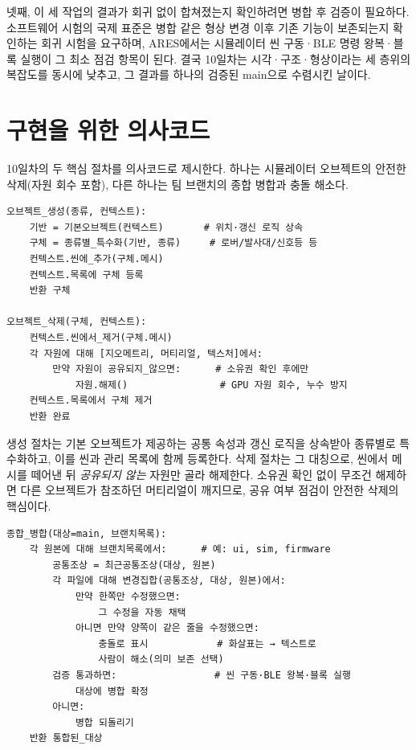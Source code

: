 넷째, 이 세 작업의 결과가 회귀 없이 합쳐졌는지 확인하려면 병합 후 검증이 필요하다. 소프트웨어 시험의 국제 표준은 병합 같은 형상 변경 이후 기존 기능이 보존되는지 확인하는 회귀 시험을 요구하며\cite{iso29119,ieee829}, ARES에서는 시뮬레이터 씬 구동·BLE 명령 왕복·블록 실행이 그 최소 점검 항목이 된다. 결국 10일차는 시각·구조·형상이라는 세 층위의 복잡도를 동시에 낮추고, 그 결과를 하나의 검증된 main으로 수렴시킨 날이다.

\section{구현을 위한 의사코드}

10일차의 두 핵심 절차를 의사코드로 제시한다. 하나는 시뮬레이터 오브젝트의 안전한 삭제(자원 회수 포함), 다른 하나는 팀 브랜치의 종합 병합과 충돌 해소다.

\begin{verbatim}
오브젝트_생성(종류, 컨텍스트):
    기반 = 기본오브젝트(컨텍스트)       # 위치·갱신 로직 상속
    구체 = 종류별_특수화(기반, 종류)     # 로버/발사대/신호등 등
    컨텍스트.씬에_추가(구체.메시)
    컨텍스트.목록에 구체 등록
    반환 구체

오브젝트_삭제(구체, 컨텍스트):
    컨텍스트.씬에서_제거(구체.메시)
    각 자원에 대해 [지오메트리, 머티리얼, 텍스처]에서:
        만약 자원이 공유되지_않으면:      # 소유권 확인 후에만
            자원.해제()                # GPU 자원 회수, 누수 방지
    컨텍스트.목록에서 구체 제거
    반환 완료
\end{verbatim}

생성 절차는 기본 오브젝트가 제공하는 공통 속성과 갱신 로직을 상속받아 종류별로 특수화하고, 이를 씬과 관리 목록에 함께 등록한다. 삭제 절차는 그 대칭으로, 씬에서 메시를 떼어낸 뒤 \emph{공유되지 않는} 자원만 골라 해제한다. 소유권 확인 없이 무조건 해제하면 다른 오브젝트가 참조하던 머티리얼이 깨지므로, 공유 여부 점검이 안전한 삭제의 핵심이다.

\begin{verbatim}
종합_병합(대상=main, 브랜치목록):
    각 원본에 대해 브랜치목록에서:      # 예: ui, sim, firmware
        공통조상 = 최근공통조상(대상, 원본)
        각 파일에 대해 변경집합(공통조상, 대상, 원본)에서:
            만약 한쪽만 수정했으면:
                그 수정을 자동 채택
            아니면 만약 양쪽이 같은 줄을 수정했으면:
                충돌로 표시            # 화살표는 → 텍스트로
                사람이 해소(의미 보존 선택)
        검증 통과하면:                 # 씬 구동·BLE 왕복·블록 실행
            대상에 병합 확정
        아니면:
            병합 되돌리기
    반환 통합된_대상
\end{verbatim}

